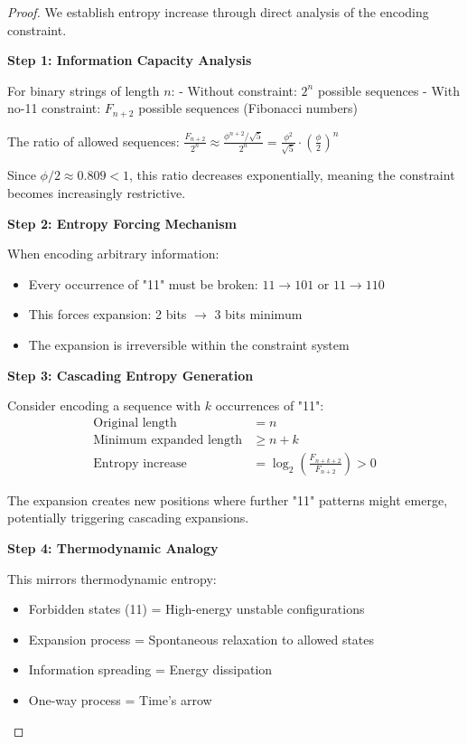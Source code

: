 \documentclass[12pt,letterpaper]{article}
\begin{document}
\begin{proof}
We establish entropy increase through direct analysis of the encoding constraint.

\textbf{Step 1: Information Capacity Analysis}

For binary strings of length $n$:
- Without constraint: $2^n$ possible sequences
- With no-11 constraint: $F_{n+2}$ possible sequences (Fibonacci numbers)

The ratio of allowed sequences: $\frac{F_{n+2}}{2^n} \approx \frac{\phi^{n+2}/\sqrt{5}}{2^n} = \frac{\phi^2}{\sqrt{5}} \cdot \left(\frac{\phi}{2}\right)^n$

Since $\phi/2 \approx 0.809 < 1$, this ratio decreases exponentially, meaning the constraint becomes increasingly restrictive.

\textbf{Step 2: Entropy Forcing Mechanism}

When encoding arbitrary information:
\begin{itemize}
\item Every occurrence of "11" must be broken: $11 \to 101$ or $11 \to 110$
\item This forces expansion: 2 bits $\to$ 3 bits minimum
\item The expansion is irreversible within the constraint system
\end{itemize}

\textbf{Step 3: Cascading Entropy Generation}

Consider encoding a sequence with $k$ occurrences of "11":
\begin{align}
\text{Original length} &= n \\
\text{Minimum expanded length} &\geq n + k \\
\text{Entropy increase} &= \log_2\left(\frac{F_{n+k+2}}{F_{n+2}}\right) > 0
\end{align}

The expansion creates new positions where further "11" patterns might emerge, potentially triggering cascading expansions.

\textbf{Step 4: Thermodynamic Analogy}

This mirrors thermodynamic entropy:
\begin{itemize}
\item Forbidden states (11) = High-energy unstable configurations
\item Expansion process = Spontaneous relaxation to allowed states
\item Information spreading = Energy dissipation
\item One-way process = Time's arrow
\end{itemize}


\end{proof}
\end{document}
